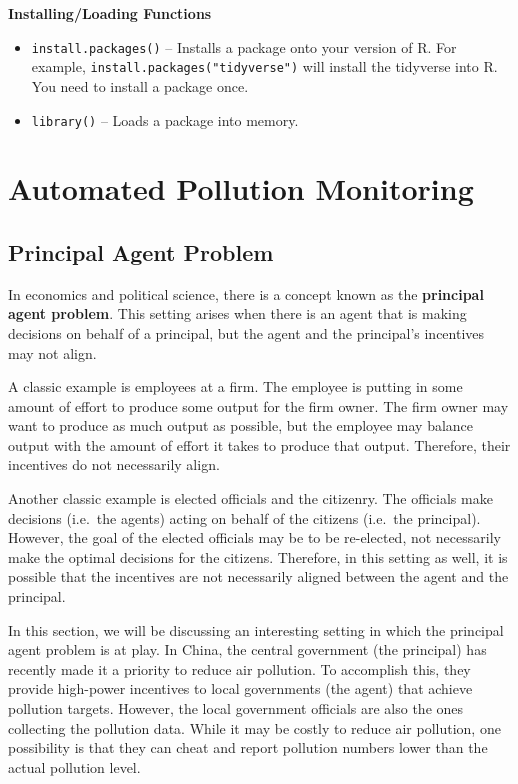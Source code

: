 \documentclass[
]{book}
\begin{document}
\textbf{Installing/Loading Functions}

\begin{itemize}
\item
  \texttt{install.packages()} -- Installs a package onto your version of R. For example, \texttt{install.packages("tidyverse")} will install the tidyverse into R. You need to install a package once.
\item
  \texttt{library()} -- Loads a package into memory.
\end{itemize}

\chapter{Automated Pollution Monitoring}\label{automated-pollution-monitoring}

\section{Principal Agent Problem}\label{principal-agent-problem}

In economics and political science, there is a concept known as the \textbf{principal agent problem}. This setting arises when there is an agent that is making decisions on behalf of a principal, but the agent and the principal's incentives may not align.

A classic example is employees at a firm. The employee is putting in some amount of effort to produce some output for the firm owner. The firm owner may want to produce as much output as possible, but the employee may balance output with the amount of effort it takes to produce that output. Therefore, their incentives do not necessarily align.

Another classic example is elected officials and the citizenry. The officials make decisions (i.e.~the agents) acting on behalf of the citizens (i.e.~the principal). However, the goal of the elected officials may be to be re-elected, not necessarily make the optimal decisions for the citizens. Therefore, in this setting as well, it is possible that the incentives are not necessarily aligned between the agent and the principal.

In this section, we will be discussing an interesting setting in which the principal agent problem is at play. In China, the central government (the principal) has recently made it a priority to reduce air pollution. To accomplish this, they provide high-power incentives to local governments (the agent) that achieve pollution targets. However, the local government officials are also the ones collecting the pollution data. While it may be costly to reduce air pollution, one possibility is that they can cheat and report pollution numbers lower than the actual pollution level.
\end{document}

